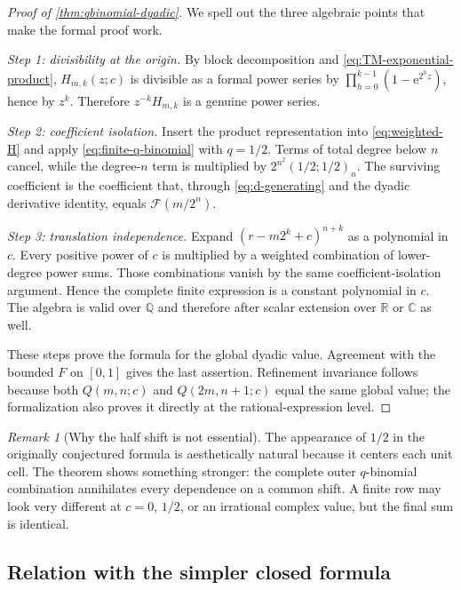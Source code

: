 \documentclass[11pt]{article}
\numberwithin{equation}{section}
\theoremstyle{definition}
\theoremstyle{remark}
\newtheorem{remark}[theorem]{Remark}
\newcommand{\R}{\mathbb R}
\newcommand{\Q}{\mathbb Q}
\newcommand{\C}{\mathbb C}
\newcommand{\GF}{\mathcal F}
\newcommand{\e}{\mathrm e}
\begin{document}
\begin{proof}[Proof of \cref{thm:qbinomial-dyadic}]
We spell out the three algebraic points that make the formal proof work.

\emph{Step 1: divisibility at the origin.}
By block decomposition and \eqref{eq:TM-exponential-product}, $H_{m,k}(z;c)$ is divisible as a formal power series by
$\prod_{h=0}^{k-1}(1-\e^{2^hz})$, hence by $z^k$.  Therefore $z^{-k}H_{m,k}$ is a genuine power series.

\emph{Step 2: coefficient isolation.}
Insert the product representation into \eqref{eq:weighted-H} and apply \eqref{eq:finite-q-binomial} with $q=1/2$.  Terms of total degree below $n$ cancel, while the degree-$n$ term is multiplied by
$2^{n^2}(1/2;1/2)_n$.  The surviving coefficient is the coefficient that, through \eqref{eq:d-generating} and the dyadic derivative identity, equals $\GF(m/2^n)$.

\emph{Step 3: translation independence.}
Expand
$(r-m2^k+c)^{n+k}$ as a polynomial in $c$.  Every positive power of $c$ is multiplied by a weighted combination of lower-degree power sums.  Those combinations vanish by the same coefficient-isolation argument.  Hence the complete finite expression is a constant polynomial in $c$.  The algebra is valid over $\Q$ and therefore after scalar extension over $\R$ or $\C$ as well.

These steps prove the formula for the global dyadic value.  Agreement with the bounded $F$ on $[0,1]$ gives the last assertion.  Refinement invariance follows because both $Q(m,n;c)$ and $Q(2m,n+1;c)$ equal the same global value; the formalization also proves it directly at the rational-expression level.
\end{proof}

\begin{remark}[Why the half shift is not essential]
The appearance of $1/2$ in the originally conjectured formula is aesthetically natural because it centers each unit cell.  The theorem shows something stronger: the complete outer $q$-binomial combination annihilates every dependence on a common shift.  A finite row may look very different at $c=0$, $1/2$, or an irrational complex value, but the final sum is identical.
\end{remark}

\subsection{Relation with the simpler closed formula}
\end{document}
